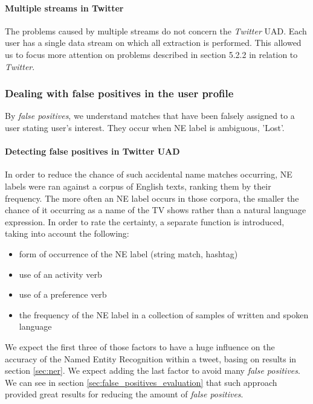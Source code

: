 \paragraph{Multiple streams in Twitter}
The problems caused by multiple streams do not concern the \textit{Twitter} UAD. Each user has a single
data stream on which all extraction is performed. This allowed us to focus more attention
on problems described in section 5.2.2 in relation to \textit{Twitter}.

\subsubsection{Dealing with false positives in the user profile}
\label{sec:false_positives}
By \textit{false positives}, we understand matches that have been falsely assigned to a user stating user's interest.
They occur when NE label is ambiguous, \eg 'Lost'.

\paragraph{Detecting false positives in Twitter UAD}

In order to reduce the chance of such accidental name matches occurring, NE labels were ran against a corpus
of English texts, ranking them by their frequency. The more often an NE label occurs in those corpora,
the smaller the chance of it occurring as a name of the TV shows rather than a natural language expression.
In order to rate the certainty, a separate function is introduced, taking into account the following:

\begin{itemize}
  \item form of occurrence of the NE label (string match, hashtag)
  \item use of an activity verb
  \item use of a preference verb
  \item the frequency of the NE label in a collection of samples of written and spoken language
\end{itemize}

We expect the first three of those factors to have a huge influence on the accuracy of the Named Entity Recognition within
a tweet, basing on results in section \ref{sec:ner}. We expect adding the last factor to avoid many \textit{false
positives}. We can see in section \ref{sec:false_positives_evaluation} that such approach provided great results for
reducing the amount of \textit{false positives}.

